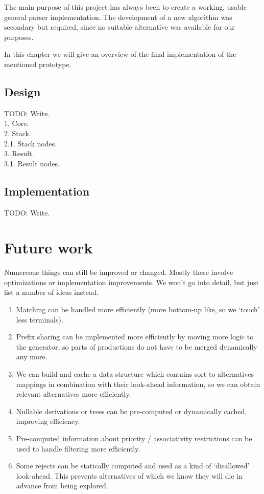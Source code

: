 \documentclass[a4paper,10pt]{article}
\begin{document}
The main purpose of this project has always been to create a working, usable general parser implementation. The development of a new algorithm was secondary but required, since no suitable alternative was available for our purposes.

In this chapter we will give an overview of the final implementation of the mentioned prototype.

\subsection{Design}

TODO: Write.\\
1. Core.\\
2. Stack.\\
2.1. Stack nodes.\\
3. Result.\\
3.1. Result nodes.

\subsection{Implementation}

TODO: Write.

\section{Future work}

Numereous things can still be improved or changed. Mostly these involve optimizations or implementation improvements. We won't go into detail, but just list a number of ideas instead.

\begin{enumerate}
 \setlength{\itemsep}{0pt}
 \setlength{\parskip}{0pt}
 \setlength{\parsep}{0pt}
 
 \item Matching can be handled more efficiently (more bottom-up like, so we `touch' less terminals).
 \item Prefix sharing can be implemented more efficiently by moving more logic to the generator, so parts of productions do not have to be merged dynamically any more.
 \item We can build and cache a data structure which contains sort to alternatives mappings in combination with their look-ahead information, so we can obtain relevant alternatives more efficiently.
 \item Nullable derivations or trees can be pre-computed or dynamically cached, improving efficiency.
 \item Pre-computed information about priority / associativity restrictions can be used to handle filtering more efficiently.
 \item Some rejects can be statically computed and used as a kind of `disallowed' look-ahead. This prevents alternatives of which we know they will die in advance from being explored.
\end{enumerate}
\end{document}
